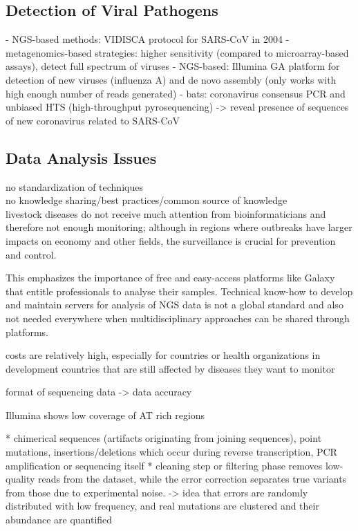 \subsection{Detection of Viral Pathogens}
- NGS-based methods: VIDISCA protocol for SARS-CoV in 2004
- metagenomics-based strategies: higher sensitivity (compared to microarray-based assays), detect full spectrum of viruses
- NGS-based: Illumina GA platform for detection of new viruses (influenza A) and de novo assembly (only works with high enough number of reads generated)
- bats: coronavirus consensus PCR and unbiased HTS (high-throughput pyrosequencing) -> reveal presence of sequences of new coronavirus related to SARS-CoV

\subsection{Data Analysis Issues}

no standardization of techniques \\
no knowledge sharing/best practices/common source of knowledge \\
livestock diseases do not receive much attention from bioinformaticians and therefore not enough monitoring;
although in regions where outbreaks have larger impacts on economy and other fields, the surveillance is crucial for prevention and control.

This emphasizes the importance of free and easy-access platforms like Galaxy that entitle professionals to analyse their samples. Technical know-how to develop and 
maintain servers for analysis of NGS data is not a global standard and also not needed everywhere when multidisciplinary approaches can be shared through platforms.

costs are relatively high, especially for countries or health organizations in development countries that are still affected by diseases they want to monitor

format of sequencing data -> data accuracy

Illumina shows low coverage of AT rich regions~\cite{harismendy2009evaluation}

* chimerical sequences (artifacts originating from joining sequences), point mutations, insertions/deletions which occur during reverse transcription, PCR amplification or sequencing itself
* cleaning step or filtering phase removes low-quality reads from the dataset, while the error correction separates true variants from those due to experimental noise. -> idea that errors are randomly distributed with low frequency, and real mutations are clustered and their abundance are quantified

